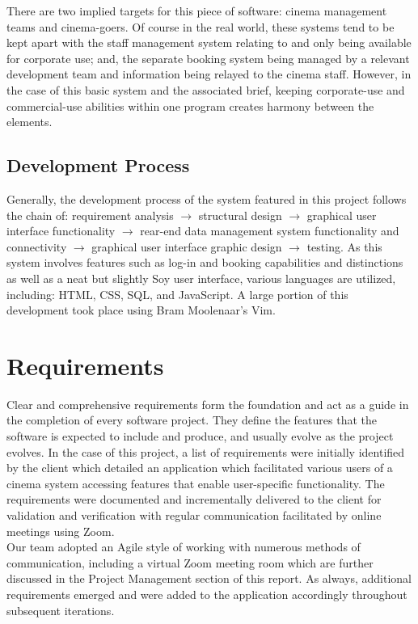 \documentclass[11pt, english]{article}
\begin{document}
	There are two implied targets for this piece of software: cinema management teams and cinema-goers. Of course in the real world, these systems tend to be kept apart with the staff management system relating to and only being available for corporate use; and, the separate booking system being managed by a relevant development team and information being relayed to the cinema staff. However, in the case of this basic system and the associated brief, keeping corporate-use and commercial-use abilities within one program creates harmony between the elements.

	\subsection{Development Process}

	Generally, the development process of the system featured in this project follows the chain of: requirement analysis $\rightarrow$ structural design $\rightarrow$ graphical user interface functionality $\rightarrow$ rear-end data management system functionality and connectivity $\rightarrow$ graphical user interface graphic design $\rightarrow$ testing. As this system involves features such as log-in and booking capabilities and distinctions as well as a neat but slightly Soy user interface, various languages are utilized, including: HTML, CSS, SQL, and JavaScript. A large portion of this development took place using Bram Moolenaar's Vim.

\newpage

\section{Requirements}

	Clear and comprehensive requirements form the foundation and act as a guide in the completion of every software project. They define the features that the software is expected to include and produce, and usually evolve as the project evolves. In the case of this project, a list of requirements were initially identified by the client which detailed an application which facilitated various users of a cinema system accessing features that enable user-specific functionality. The requirements were documented and incrementally delivered to the client for validation and verification with regular communication facilitated by online meetings using Zoom.\\

	Our team adopted an Agile style of working with numerous methods of communication, including a virtual Zoom meeting room which are further discussed in the Project Management section of this report. As always, additional requirements emerged and were added to the application accordingly throughout subsequent iterations.
\end{document}
